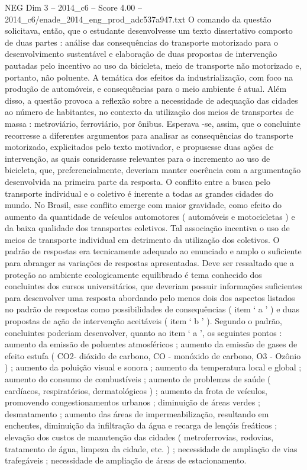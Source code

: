 \begin{textsample}{NEG Dim 3 – 2014\_c6 – Score 4.00 – 2014\_c6/enade\_2014\_eng\_prod\_adc537a947.txt}
O comando da questão solicitava, então, que o estudante desenvolvesse um texto dissertativo composto de duas partes : análise das consequências do transporte motorizado para o desenvolvimento sustentável e elaboração de duas propostas de intervenção pautadas pelo incentivo ao uso da bicicleta, meio de transporte não motorizado e, portanto, não poluente.
A temática dos efeitos da industrialização, com foco na produção de automóveis, e consequências para o meio ambiente é atual.
Além disso, a questão provoca a reflexão sobre a necessidade de adequação das cidades ao número de habitantes, no contexto da utilização dos meios de transportes de massa : metroviário, ferroviário, por ônibus.
Esperava -se, assim, que o concluinte recorresse a diferentes argumentos para analisar as consequências do transporte motorizado, explicitados pelo texto motivador, e propusesse duas ações de intervenção, as quais considerasse relevantes para o incremento ao uso de bicicleta, que, preferencialmente, deveriam manter coerência com a argumentação desenvolvida na primeira parte da resposta.
O conflito entre a busca pelo transporte individual e o coletivo é inerente a todas as grandes cidades do mundo.
No Brasil, esse conflito emerge com maior gravidade, como efeito do aumento da quantidade de veículos automotores ( automóveis e motocicletas ) e da baixa qualidade dos transportes coletivos.
Tal associação incentiva o uso de meios de transporte individual em detrimento da utilização dos coletivos.
O padrão de respostas era tecnicamente adequado ao enunciado e amplo o suficiente para abranger as variações de respostas apresentadas.
Deve ser ressaltado que a proteção ao ambiente ecologicamente equilibrado é tema conhecido dos concluintes dos cursos universitários, que deveriam possuir informações suficientes para desenvolver uma resposta abordando pelo menos dois dos aspectos listados no padrão de respostas como possibilidades de consequências ( item ‘ a ’ ) e duas propostas de ação de intervenção aceitáveis ( item ‘ b ’ ).
Segundo o padrão, concluintes poderiam desenvolver, quanto ao item ‘ a ’, os seguintes pontos : aumento da emissão de poluentes atmosféricos ; aumento da emissão de gases de efeito estufa ( CO2- dióxido de carbono, CO - monóxido de carbono, O3 - Ozônio ) ; aumento da poluição visual e sonora ; aumento da temperatura local e global ; aumento do consumo de combustíveis ; aumento de problemas de saúde ( cardíacos, respiratórios, dermatológicos ) ; aumento da frota de veículos, promovendo congestionamentos urbanos ; diminuição de áreas verdes ; desmatamento ; aumento das áreas de impermeabilização, resultando em enchentes, diminuição da infiltração da água e recarga de lençóis freáticos ; elevação dos custos de manutenção das cidades ( metroferrovias, rodovias, tratamento de água, limpeza da cidade, etc. ) ; necessidade de ampliação de vias trafegáveis ; necessidade de ampliação de áreas de estacionamento.

\end{textsample}
